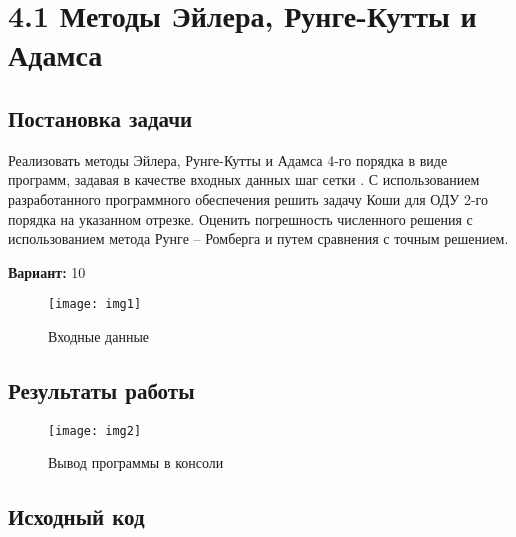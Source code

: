 \section* {4.1 Методы Эйлера, Рунге-Кутты и Адамса}

\subsection{Постановка задачи}
Реализовать методы Эйлера, Рунге-Кутты и Адамса 4-го порядка в виде программ, задавая в качестве входных данных шаг сетки  . С использованием разработанного программного обеспечения решить задачу Коши для ОДУ 2-го порядка на указанном отрезке. Оценить погрешность численного решения с использованием метода Рунге – Ромберга и путем сравнения с точным решением. 

{\bfseries Вариант:} 10

\begin{figure}[h!]
\centering
\texttt{[image: img1]}
\caption{Входные данные}
\end{figure}

\subsection{Результаты работы}
\begin{figure}[h!]
\centering
\texttt{[image: img2]}
\caption{Вывод программы в консоли}
\end{figure}


\pagebreak

\subsection{Исходный код}
% 

% 
% 
% 